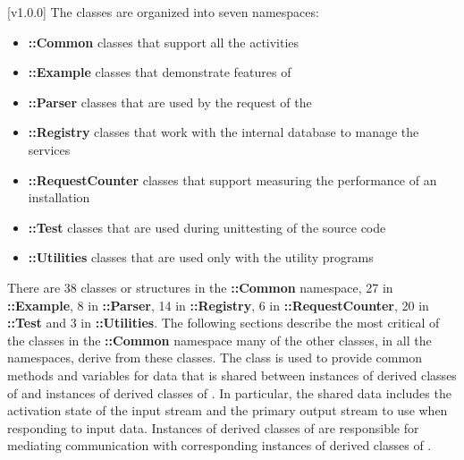 [v1.0.0]
The \mplusm{} classes are organized into seven namespaces:
\begin{itemize}
\item\textbf{\mplusm{}::Common} classes that support all the \mplusm{} activities
\item\exSp\textbf{\mplusm{}::Example} classes that demonstrate features of \mplusm{}
\item\exSp\textbf{\mplusm{}::Parser} classes that are used by the
 request of the
\item\exSp\textbf{\mplusm{}::Registry} classes that work with the internal database to
manage the \mplusm{} services
\item\exSp\textbf{\mplusm{}::RequestCounter} classes that support measuring the
performance of an \mplusm{} installation
\item\exSp\textbf{\mplusm{}::Test} classes that are used during unit\longDash{}testing of
the \mplusm{} source code
\item\exSp\textbf{\mplusm{}::Utilities} classes that are used only with the \mplusm{}
utility programs
\end{itemize}
There are 38 classes or structures in the \textbf{\mplusm{}::Common} namespace, 27 in
\textbf{\mplusm{}::Example}, 8 in \textbf{\mplusm{}::Parser}, 14 in
\textbf{\mplusm{}::Registry}, 6 in \textbf{\mplusm{}::RequestCounter}, 20 in
\textbf{\mplusm{}::Test} and 3 in \textbf{\mplusm{}::Utilities}.
The following sections describe the most critical of the classes in the
\textbf{\mplusm{}::Common} namespace \longDash{} many of the other classes, in all the
namespaces, derive from these classes. 
The class  is used to
provide common methods and variables for data that is shared between instances of
derived classes of  and instances of derived
classes of .
In particular, the shared data includes the activation state of the input stream and the
primary output stream to use when responding to input data.
Instances of derived classes of 
are responsible for mediating \mplusm{} communication with corresponding instances of
derived classes of .\\

